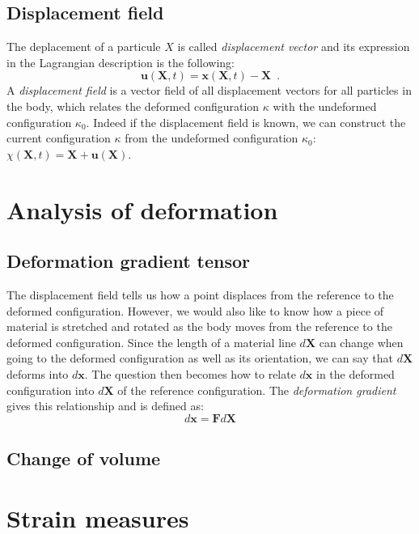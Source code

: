 	\subsection{Displacement field}
The deplacement of a particule $X$ is called \emph{displacement vector} and its expression in the Lagrangian description is the following:
\begin{equation}
\textbf{u}(\textbf{X}, t) = \textbf{x}(\textbf{X}, t) - \textbf{X} \enspace .
\end{equation}
A \emph{displacement field} is a vector field of all displacement vectors for all particles in the body, which relates the deformed configuration $\kappa$ with the undeformed configuration $\kappa_{0}$. Indeed if the displacement field is known, we can construct the current configuration $\kappa$ from the undeformed configuration $\kappa_{0}$: $\chi(\textbf{X}, t) = \textbf{X} + \textbf{u}(\textbf{X})$. 	
	
\section{Analysis of deformation}

	\subsection{Deformation gradient tensor}
The displacement field tells us how a point displaces from the reference to the deformed configuration. However, we would also like to know how a piece of material is stretched and rotated as the body moves from the reference to the deformed configuration. Since the length of a material line $d\textbf{X}$ can change when going to the deformed configuration as well as its orientation, we can say that $d\textbf{X}$ deforms into $d\textbf{x}$. The question then becomes how to relate $d\textbf{x}$ in the deformed configuration into $d\textbf{X}$ of the reference configuration. The \emph{deformation gradient} gives this relationship and is defined as:
\begin{equation}
d\textbf{x} = \textbf{F}  d\textbf{X}
\end{equation}


	\subsection{Change of volume}


		
	\newpage
			
\section{Strain measures}
